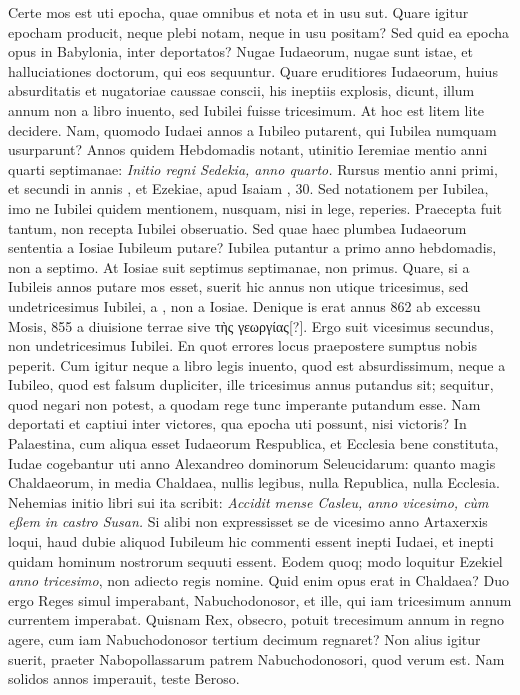 Certe mos est uti epocha, quae omnibus et nota et in usu sut.
Quare
igitur epocham producit, neque plebi notam, neque in usu positam?
Sed quid ea epocha opus in Babylonia, inter deportatos?
Nugae Iudaeorum,
nugae sunt istae, et halluciationes doctorum, qui eos sequuntur.
Quare eruditiores Iudaeorum, huius absurditatis et nugatoriae
caussae conscii, his ineptiis explosis, dicunt, illum annum non a
libro inuento, sed Iubilei fuisse tricesimum.
At hoc est litem lite decidere.
Nam, quomodo Iudaei annos a Iubileo putarent, qui Iubilea
numquam usurparunt?
Annos quidem Hebdomadis notant, utinitio
 Ieremiae mentio anni quarti septimanae: \textit{Initio regni
Sedekia, anno quarto.}
Rursus mentio anni primi, et secundi in annis
, et  Ezekiae, apud Isaiam , 30.
Sed notationem
per Iubilea, imo ne Iubilei quidem mentionem, nusquam, nisi
in lege, reperies.
Praecepta fuit tantum, non recepta Iubilei obseruatio.
Sed quae haec plumbea Iudaeorum sententia a  Iosiae
Iubileum putare?
Iubilea putantur a primo anno hebdomadis, non
a septimo.
At  Iosiae suit septimus septimanae, non primus.
Quare, si a Iubileis annos putare mos esset, suerit hic annus non utique
tricesimus, sed undetricesimus Iubilei, a , non a
 Iosiae.
Denique is erat annus 862 ab excessu Mosis, 855 a
diuisione terrae sive \textgreek{τὴς γεωργίας[?]}.
Ergo suit vicesimus secundus, non
undetricesimus Iubilei.
En quot errores locus praepostere sumptus
nobis peperit.
Cum igitur neque a libro legis inuento, quod est absurdissimum,
neque a Iubileo, quod est falsum dupliciter, ille tricesimus
annus putandus sit; sequitur, quod negari non potest, a
quodam rege tunc imperante putandum esse.
Nam deportati et captiui
inter victores, qua epocha uti possunt, nisi victoris?
In Palaestina,
cum aliqua esset Iudaeorum Respublica, et Ecclesia bene constituta,
Iudae cogebantur uti anno Alexandreo dominorum Seleucidarum:
quanto magis Chaldaeorum, in media Chaldaea, nullis legibus,
nulla Republica, nulla Ecclesia.
Nehemias initio libri sui ita
scribit: \textit{Accidit mense Casleu, anno vicesimo, cùm eßem in castro Susan.}
Si alibi non expressisset se de vicesimo anno Artaxerxis loqui, haud
dubie aliquod Iubileum hic commenti essent inepti Iudaei, et inepti
quidam hominum nostrorum sequuti essent.
Eodem quoq; modo
loquitur Ezekiel \textit{anno tricesimo}, non adiecto regis nomine.
Quid enim opus erat in Chaldaea?
Duo ergo Reges simul imperabant,
Nabuchodonosor, et ille, qui iam tricesimum annum currentem
imperabat.
Quisnam Rex, obsecro, potuit trecesimum annum in regno
agere, cum iam Nabuchodonosor tertium decimum regnaret?
Non alius igitur suerit, praeter Nabopollassarum patrem Nabuchodonosori,
quod verum est.
Nam  solidos annos imperauit,
teste Beroso.

